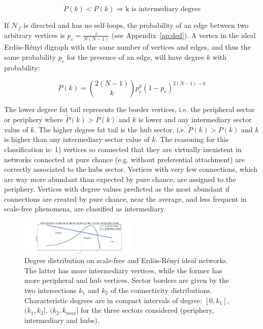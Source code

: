 \documentclass[%
 aip,
 jmp,%
 amsmath,amssymb,
 reprint,%
]{revtex4-1}
\begin{document}
\begin{equation}\label{criterio}
    \widetilde{P}(k)<P(k) \Rightarrow \text{k is intermediary degree}
\end{equation}

If $\mathcal{N}_f$ is directed and has no self-loops, the probability
of an edge between two arbitrary vertices is $p_e=\frac{z}{N(N-1)}$ (see Appendix~\ref{ap:ded}).
A vertex in the ideal Erd\"os-R\'enyi digraph with the same number of vertices and edges, and thus the same probability $p_e$ for the presence of an edge, will have degree $k$ with probability:

\begin{equation}
    P(k)=\binom{2(N-1)}{k}p_e^k(1-p_e)^{2(N-1)-k}
\end{equation}

The lower degree fat tail represents the border vertices, i.e. the peripheral sector or periphery where $\widetilde{P}(k)>P(k)$ and $k$ is lower and any intermediary sector value of $k$. The higher degree fat tail is the hub sector, i.e. $\widetilde{P}(k)>P(k)$ and $k$ is higher than any intermediary sector value of $k$. The reasoning for this classification is: 1) vertices so connected that they are virtually inexistent in networks connected at pure chance (e.g. without preferential attachment) are correctly associated to the hubs sector. Vertices with very few connections, which are way more abundant than expected by pure chance, are assigned to the periphery. Vertices with degree values predicted as the most abundant if connections are created by pure chance, near the average, and less frequent in scale-free phenomena, are classified as intermediary. 
\begin{figure}[!h]
    \centering
    \includegraphics[width=0.5\textwidth]{figs/fser}
    \caption{Degree distribution on scale-free and Erd\"os-R\'enyi ideal networks. The latter has more
        intermediary vertices, while the former has more peripheral and hub vertices. Sector borders are
        given by the two intersections $k_1$ and $k_2$ of the connectivity distributions. Characteristic degrees
    are in compact intervals of degree: $[0,k_1]$, $(k_1,k_2]$, $(k_2,k_{max}]$ for the three sectors considered (periphery, intermediary and hubs).}
    \label{fig:setores}
\end{figure}
\end{document}
